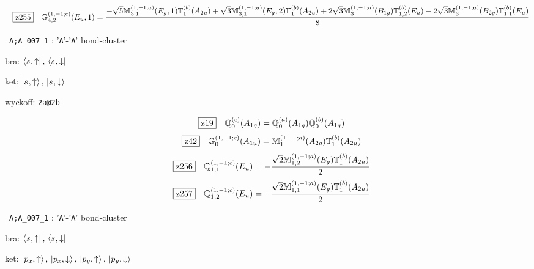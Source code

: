 \documentclass[fleqn,10pt,landscape]{jsarticle}
\begin{document}
\begin{dmath*}
\hspace*{3mm}\fbox{z255}\quad \mathbb{G}_{4,2}^{(1,-1;c)}(E_{u},1)=\frac{- \sqrt{5} \mathbb{M}_{3,1}^{(1,-1;a)}(E_{g},1) \mathbb{T}_{1}^{(b)}(A_{2u}) + \sqrt{3} \mathbb{M}_{3,1}^{(1,-1;a)}(E_{g},2) \mathbb{T}_{1}^{(b)}(A_{2u}) + 2 \sqrt{3} \mathbb{M}_{3}^{(1,-1;a)}(B_{1g}) \mathbb{T}_{1,2}^{(b)}(E_{u}) - 2 \sqrt{3} \mathbb{M}_{3}^{(1,-1;a)}(B_{2g}) \mathbb{T}_{1,1}^{(b)}(E_{u})}{8}
\end{dmath*}
\vspace{5mm}

\noindent\textbullet\, \texttt{A;A_007_1} : '\texttt{A}'-'\texttt{A}' bond-cluster

\noindent\quad * bra: $\bra{s_{},\uparrow},\, \bra{s_{},\downarrow}$

\noindent\quad * ket: $\ket{s_{},\uparrow},\, \ket{s_{},\downarrow}$

\noindent\quad * wyckoff: \texttt{2a@2b}

\begin{dmath*}
\hspace*{3mm}\fbox{z19}\quad \mathbb{Q}_{0}^{(c)}(A_{1g})=\mathbb{Q}_{0}^{(a)}(A_{1g}) \mathbb{Q}_{0}^{(b)}(A_{1g})
\end{dmath*}
\begin{dmath*}
\hspace*{3mm}\fbox{z42}\quad \mathbb{G}_{0}^{(1,-1;c)}(A_{1u})=\mathbb{M}_{1}^{(1,-1;a)}(A_{2g}) \mathbb{T}_{1}^{(b)}(A_{2u})
\end{dmath*}
\begin{dmath*}
\hspace*{3mm}\fbox{z256}\quad \mathbb{Q}_{1,1}^{(1,-1;c)}(E_{u})=- \frac{\sqrt{2} \mathbb{M}_{1,2}^{(1,-1;a)}(E_{g}) \mathbb{T}_{1}^{(b)}(A_{2u})}{2}
\end{dmath*}
\begin{dmath*}
\hspace*{3mm}\fbox{z257}\quad \mathbb{Q}_{1,2}^{(1,-1;c)}(E_{u})=- \frac{\sqrt{2} \mathbb{M}_{1,1}^{(1,-1;a)}(E_{g}) \mathbb{T}_{1}^{(b)}(A_{2u})}{2}
\end{dmath*}
\vspace{5mm}

\noindent\textbullet\, \texttt{A;A_007_1} : '\texttt{A}'-'\texttt{A}' bond-cluster

\noindent\quad * bra: $\bra{s_{},\uparrow},\, \bra{s_{},\downarrow}$

\noindent\quad * ket: $\ket{p_{x},\uparrow},\, \ket{p_{x},\downarrow},\, \ket{p_{y},\uparrow},\, \ket{p_{y},\downarrow}$
\end{document}
